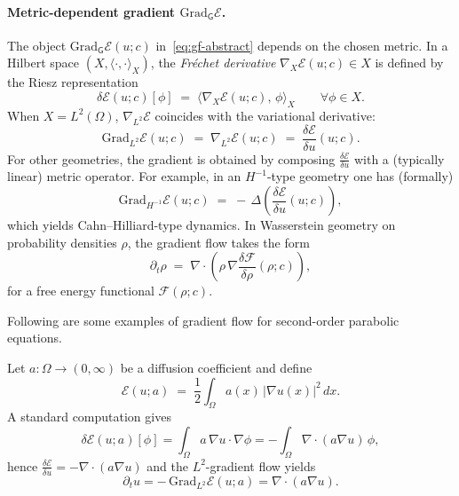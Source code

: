 \documentclass[11pt]{article}
\newcommand{\Grad}{\mathrm{Grad}}
\begin{document}
\paragraph{Metric-dependent gradient $\Grad_{\mathsf G}\mathcal E$.}
The object $\Grad_{\mathsf G}\mathcal E(u;c)$ in~\eqref{eq:gf-abstract} depends on the chosen metric.
In a Hilbert space $(X,\langle\cdot,\cdot\rangle_X)$, the \textit{Fr\'echet derivative} $\nabla_X\mathcal E(u;c)\in X$ is defined by the Riesz representation
\begin{equation}
\label{eq:riesz}
\delta\mathcal E(u;c)[\phi]
\;=\;
\big\langle \nabla_X\mathcal E(u;c),\,\phi\big\rangle_X
\qquad \forall \phi\in X.
\end{equation}
When $X=L^2(\Omega)$, $\nabla_{L^2}\mathcal E$ coincides with the variational derivative:
\begin{equation}
\label{eq:l2-grad}
\Grad_{L^2}\mathcal E(u;c)
\;=\;
\nabla_{L^2}\mathcal E(u;c)
\;=\;
\frac{\delta \mathcal E}{\delta u}(u;c).
\end{equation}
For other geometries, the gradient is obtained by composing $\frac{\delta\mathcal E}{\delta u}$ with a (typically linear) metric operator.
For example, in an $H^{-1}$-type geometry one has (formally)
\begin{equation}
\label{eq:hminus1-grad}
\Grad_{H^{-1}}\mathcal E(u;c)
\;=\;
-\,\Delta\!\left(\frac{\delta\mathcal E}{\delta u}(u;c)\right),
\end{equation}
which yields Cahn--Hilliard-type dynamics.
In Wasserstein geometry on probability densities $\rho$, the gradient flow takes the form
\begin{equation}
\label{eq:w2-gradflow}
\partial_t \rho
\;=\;
\nabla\cdot\!\left(
\rho\,\nabla \frac{\delta \mathcal F}{\delta \rho}(\rho;c)
\right),
\end{equation}
for a free energy functional $\mathcal F(\rho;c)$.

Following are some examples of gradient flow for second-order parabolic equations.
\begin{example}
Let $a:\Omega\to(0,\infty)$ be a diffusion coefficient and define
\begin{equation}
\label{eq:diffusion-energy}
\mathcal E(u;a)
\;=\;
\frac12\int_\Omega a(x)\,|\nabla u(x)|^2\,dx.
\end{equation}
A standard computation gives
\begin{equation}
\delta\mathcal E(u;a)[\phi]
=
\int_\Omega a\,\nabla u\cdot\nabla\phi
=
-\int_\Omega \nabla\cdot(a\nabla u)\,\phi,
\end{equation}
hence $\frac{\delta\mathcal E}{\delta u}=-\nabla\cdot(a\nabla u)$ and the $L^2$-gradient flow yields
\begin{equation}
\label{eq:diffusion-gf}
\partial_t u
=
-\,\Grad_{L^2}\mathcal E(u;a)
=
\nabla\cdot(a\nabla u).
\end{equation}
\end{example}
\end{document}
